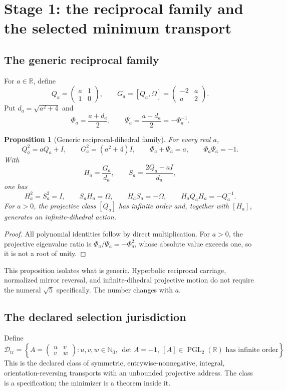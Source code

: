 \documentclass[11pt]{article}
\newtheorem{proposition}[theorem]{Proposition}
\newcommand{\R}{\mathbb R}
\newcommand{\N}{\mathbb N}
\newcommand{\Dtr}{\mathcal D_{\mathrm{tr}}}
\newcommand{\PGL}{\operatorname{PGL}}
\begin{document}
\section{Stage 1: the reciprocal family and the selected minimum transport}

\subsection{The generic reciprocal family}
For $a\in\R$, define
\[
Q_a=\begin{pmatrix}a&1\\1&0\end{pmatrix},
\qquad
G_a=[Q_a,\Omega]
=\begin{pmatrix}-2&a\\a&2\end{pmatrix}.
\]
Put $d_a=\sqrt{a^2+4}$ and
\[
\Phi_a=\frac{a+d_a}{2},
\qquad
\Psi_a=\frac{a-d_a}{2}=-\Phi_a^{-1}.
\]

\begin{proposition}[Generic reciprocal-dihedral family]
For every real $a$,
\[
Q_a^2=aQ_a+I,
\qquad
G_a^2=(a^2+4)I,
\qquad
\Phi_a+\Psi_a=a,
\qquad
\Phi_a\Psi_a=-1.
\]
With
\[
H_a=\frac{G_a}{d_a},
\qquad
S_a=\frac{2Q_a-aI}{d_a},
\]
one has
\[
H_a^2=S_a^2=I,
\qquad
S_aH_a=\Omega,
\qquad
H_aS_a=-\Omega,
\qquad
H_aQ_aH_a=-Q_a^{-1}.
\]
For $a>0$, the projective class $[Q_a]$ has infinite order and, together with $[H_a]$, generates an infinite-dihedral action.
\end{proposition}
\begin{proof}
All polynomial identities follow by direct multiplication. For $a>0$, the projective eigenvalue ratio is $\Phi_a/\Psi_a=-\Phi_a^2$, whose absolute value exceeds one, so it is not a root of unity.
\end{proof}

This proposition isolates what is generic. Hyperbolic reciprocal carriage, normalized mirror reversal, and infinite-dihedral projective motion do not require the numeral $\sqrt5$ specifically. The number changes with $a$.

\subsection{The declared selection jurisdiction}
Define
\[
\Dtr=
\left\{
A=\begin{pmatrix}u&v\\v&w\end{pmatrix}:
 u,v,w\in\N_0,
\ \det A=-1,
\ [A]\in\PGL_2(\R)\text{ has infinite order}
\right\}.
\]
This is the declared class of symmetric, entrywise-nonnegative, integral, orientation-reversing transports with an unbounded projective address. The class is a specification; the minimizer is a theorem inside it.
\end{document}
